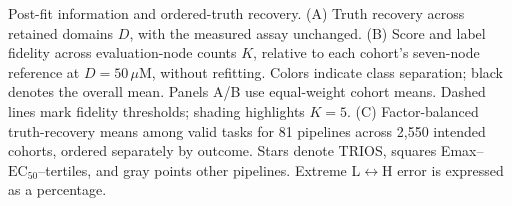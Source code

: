 Post-fit information and ordered-truth recovery. (A) Truth recovery across retained domains \(D\), with the measured assay unchanged. (B) Score and label fidelity across evaluation-node counts \(K\), relative to each cohort's seven-node reference at \(D=50\,\mu\mathrm{M}\), without refitting. Colors indicate class separation; black denotes the overall mean. Panels A/B use equal-weight cohort means. Dashed lines mark fidelity thresholds; shading highlights \(K=5\). (C) Factor-balanced truth-recovery means among valid tasks for 81 pipelines across 2,550 intended cohorts, ordered separately by outcome. Stars denote TRIOS, squares Emax--\(\mathrm{EC}_{50}\)--tertiles, and gray points other pipelines. Extreme L\(\leftrightarrow\)H error is expressed as a percentage.
